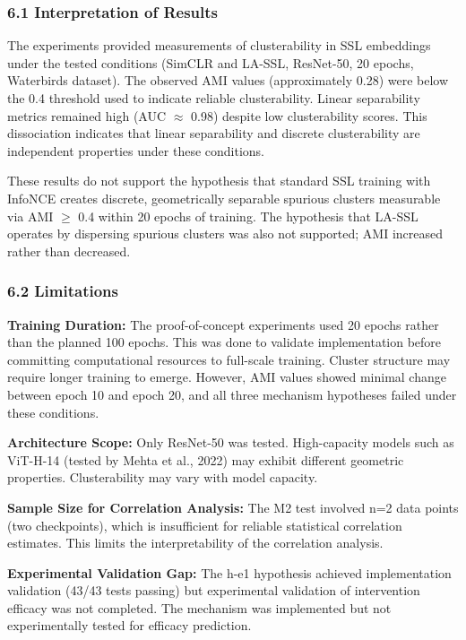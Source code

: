 
\subsubsection{6.1 Interpretation of Results}

The experiments provided measurements of clusterability in SSL embeddings under the tested conditions (SimCLR and LA-SSL, ResNet-50, 20 epochs, Waterbirds dataset). The observed AMI values (approximately 0.28) were below the 0.4 threshold used to indicate reliable clusterability. Linear separability metrics remained high (AUC $\approx$ 0.98) despite low clusterability scores. This dissociation indicates that linear separability and discrete clusterability are independent properties under these conditions.

These results do not support the hypothesis that standard SSL training with InfoNCE creates discrete, geometrically separable spurious clusters measurable via AMI $\geq$ 0.4 within 20 epochs of training. The hypothesis that LA-SSL operates by dispersing spurious clusters was also not supported; AMI increased rather than decreased.

\subsubsection{6.2 Limitations}

\textbf{Training Duration:} The proof-of-concept experiments used 20 epochs rather than the planned 100 epochs. This was done to validate implementation before committing computational resources to full-scale training. Cluster structure may require longer training to emerge. However, AMI values showed minimal change between epoch 10 and epoch 20, and all three mechanism hypotheses failed under these conditions.

\textbf{Architecture Scope:} Only ResNet-50 was tested. High-capacity models such as ViT-H-14 (tested by Mehta et al., 2022) may exhibit different geometric properties. Clusterability may vary with model capacity.

\textbf{Sample Size for Correlation Analysis:} The M2 test involved n=2 data points (two checkpoints), which is insufficient for reliable statistical correlation estimates. This limits the interpretability of the correlation analysis.

\textbf{Experimental Validation Gap:} The h-e1 hypothesis achieved implementation validation (43/43 tests passing) but experimental validation of intervention efficacy was not completed. The mechanism was implemented but not experimentally tested for efficacy prediction.

